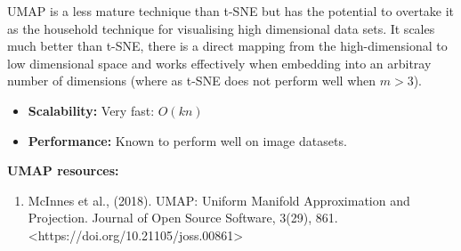 \documentclass[11pt]{article} %
\begin{document}
UMAP is a less mature technique than t-SNE but has the potential to overtake it as the household technique for visualising high dimensional data sets. It scales much better than t-SNE, there is a direct mapping from the high-dimensional to low dimensional space and works effectively when embedding into an arbitray number of dimensions (where as t-SNE does not perform well when $m>3$).

\begin{itemize}
\item \textbf{Scalability:}  Very fast: $O(kn)$
\item \textbf{Performance:} Known to perform well on image datasets.
\end{itemize}

\textbf{UMAP resources:}

\begin{enumerate}
\item  McInnes et al., (2018). UMAP: Uniform Manifold Approximation and Projection. Journal of Open Source Software, 3(29), 861. <https://doi.org/10.21105/joss.00861>
\end{enumerate}
\end{document}

